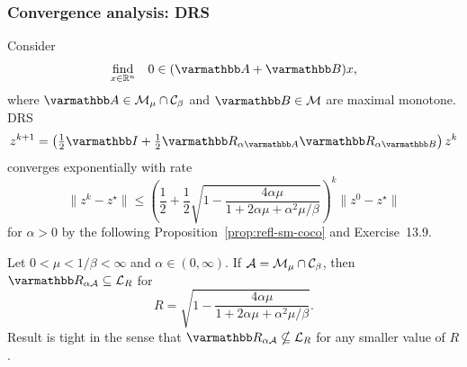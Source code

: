 \documentclass[10pt,mathserif]{beamer}
\begin{document}
\begin{frame}[plain]
\frametitle{Convergence analysis: DRS}
Consider 
\[
\begin{array}{ll}
\underset{x\in \reals^n}{\mbox{find}}&0\in (\opA+\opB) x,
\end{array}
\]
where $\opA\in \cM_\mu\cap \cC_\beta$ and $\opB\in\cM$ are maximal monotone.
DRS
\[
z^{k+1}=\left(\tfrac{1}{2}\opI+\tfrac{1}{2}\opR_{\alpha \opA}\opR_{\alpha \opB}\right)z^k
\]
converges exponentially with rate 
\[
\|z^k-z^\star\|\le
\left(
\frac{1}{2}+\frac{1}{2}
\sqrt{1-\frac{4\alpha\mu}{1+2\alpha\mu+\alpha^2\mu/\beta}}\right)^k
\|z^0-z^\star\|
\]
for $\alpha>0$ by the following Proposition~\ref{prop:refl-sm-coco} and Exercise~13.9.


\vspace{0.2in}


\begin{proposition}
\label{prop:refl-sm-coco}
Let $0<\mu<1/\beta<\infty$ and $\alpha\in(0,\infty)$.
If ${\mathcal{A}}= {\mathcal{M}}_\mu\cap {\mathcal{C}}_\beta$, then $\opR_{\alpha \cA}\subseteq \cL_R$ for
\[
R=\sqrt{1-\frac{4\alpha\mu}{1+2\alpha\mu+\alpha^2\mu/\beta}}.
\]
Result is tight in the sense that $\opR_{\alpha \cA}\nsubseteq \cL_R$ for any smaller value of $R$.
\end{proposition}
\end{frame}
\end{document}
